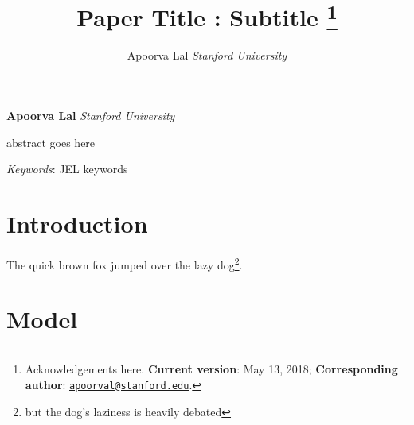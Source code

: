 \documentclass[12pt,]{article}
\title{Paper Title : Subtitle \thanks{Acknowledgements here. \textbf{Current version}: May 13, 2018;
\textbf{Corresponding author}:
\href{mailto:apoorval@stanford.edu}{\nolinkurl{apoorval@stanford.edu}}.}  }
\author{\Large Apoorva Lal\vspace{0.05in} \newline\normalsize\emph{Stanford University}  }
\date{}
\renewenvironment{abstract}
 {{%
    \setlength{\leftmargin}{0mm}
    \setlength{\rightmargin}{\leftmargin}%
  }%
  \relax}
 {\endlist}
\begin{document}
%



\maketitle

{%
\thispagestyle{plain}
{ \selectfont
\maketitle  %
}

\begin{center}
{
   \vskip 13.5pt\relax \normalsize\fontsize{14}{14}
\textbf{Apoorva Lal} \hskip 15pt \emph{\small Stanford University}   
}
\end{center}
}





\begin{abstract}

    \hbox{\vrule height .2pt width 39.14pc}

    \vskip 8.5pt %

\noindent abstract goes here


\vskip 8.5pt \noindent \emph{Keywords}: JEL keywords \par

    \hbox{\vrule height .2pt width 39.14pc}



\end{abstract}


\vskip 6.5pt

{
\hypersetup{linkcolor=black}
\setcounter{tocdepth}{3}
\tableofcontents
}

\newpage


\noindent \doublespacing \hypertarget{introduction}{%
\section{Introduction}\label{introduction}}

\textcite{Deatonanalysishouseholdsurveys1997}

The quick brown fox jumped over the lazy dog\footnote{but the dog's
  laziness is heavily debated}.

\hypertarget{model}{%
\section{Model}\label{model}}
\end{document}
